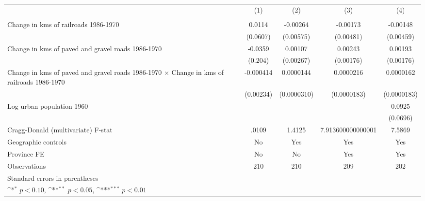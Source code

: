 {
\def\sym#1{\ifmmode^{#1}\else\(^{#1}\)\fi}
\begin{tabular}{l*{4}{c}}
\hline\hline
                &\multicolumn{1}{c}{(1)}&\multicolumn{1}{c}{(2)}&\multicolumn{1}{c}{(3)}&\multicolumn{1}{c}{(4)}\\
                &\multicolumn{1}{c}{}&\multicolumn{1}{c}{}&\multicolumn{1}{c}{}&\multicolumn{1}{c}{}\\
\hline
Change in kms of railroads 1986-1970&   0.0114         & -0.00264         & -0.00173         & -0.00148         \\
                & (0.0607)         &(0.00575)         &(0.00481)         &(0.00459)         \\
[1em]
Change in kms of paved and gravel roads 1986-1970&  -0.0359         &  0.00107         &  0.00243         &  0.00193         \\
                &  (0.204)         &(0.00267)         &(0.00176)         &(0.00176)         \\
[1em]
Change in kms of paved and gravel roads 1986-1970 $\times$ Change in kms of railroads 1986-1970&-0.000414         &0.0000144         &0.0000216         &0.0000162         \\
                &(0.00234)         &(0.0000310)         &(0.0000183)         &(0.0000183)         \\
[1em]
Log urban population 1960&                  &                  &                  &   0.0925         \\
                &                  &                  &                  & (0.0696)         \\
\hline
Cragg-Donald (multivariate) F-stat&    .0109         &   1.4125         &7.913600000000001         &   7.5869         \\
Geographic controls&       No         &      Yes         &      Yes         &      Yes         \\
Province FE     &       No         &       No         &      Yes         &      Yes         \\
Observations    &      210         &      210         &      209         &      202         \\
\hline\hline
\multicolumn{5}{l}{\footnotesize Standard errors in parentheses}\\
\multicolumn{5}{l}{\footnotesize \sym{*} \(p<0.10\), \sym{**} \(p<0.05\), \sym{***} \(p<0.01\)}\\
\end{tabular}
}
